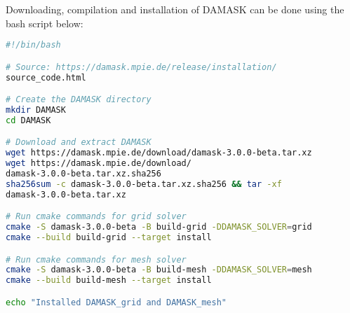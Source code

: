 Downloading, compilation and installation of DAMASK can be done using the bash script below:

\begin{lstlisting}[language=bash, basicstyle=\small\ttfamily, frame=single]
#!/bin/bash

# Source: https://damask.mpie.de/release/installation/
source_code.html

# Create the DAMASK directory
mkdir DAMASK
cd DAMASK

# Download and extract DAMASK
wget https://damask.mpie.de/download/damask-3.0.0-beta.tar.xz
wget https://damask.mpie.de/download/
damask-3.0.0-beta.tar.xz.sha256
sha256sum -c damask-3.0.0-beta.tar.xz.sha256 && tar -xf 
damask-3.0.0-beta.tar.xz

# Run cmake commands for grid solver
cmake -S damask-3.0.0-beta -B build-grid -DDAMASK_SOLVER=grid
cmake --build build-grid --target install

# Run cmake commands for mesh solver
cmake -S damask-3.0.0-beta -B build-mesh -DDAMASK_SOLVER=mesh
cmake --build build-mesh --target install

echo "Installed DAMASK_grid and DAMASK_mesh"
\end{lstlisting}
